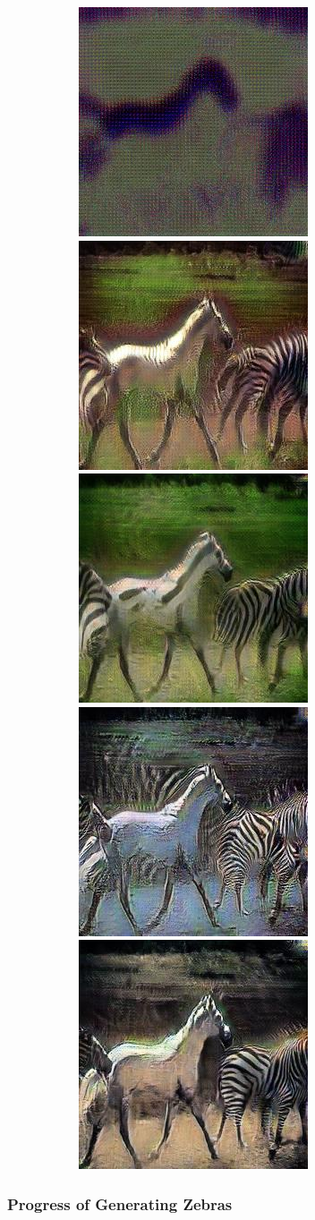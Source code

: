 \documentclass[12pt, fleqn, titlepage]{article}
\newcommand\skipper{1.4pt}
\newcommand\ripper{2.5pt}
\begin{document}
\begin{figure}[H]
\begin{subfigure}[b]{0.8\textwidth}
	\end{subfigure}
	\vskip\ripper
	\begin{subfigure}[b]{0.8\textwidth}
		\centering
		\includegraphics[width=0.15\linewidth]{imgs/horse2zebra_cycle/gaussnoise/progress/59_0_fake_b}
		\hskip\skipper
		\includegraphics[width=0.15\linewidth]{imgs/horse2zebra_cycle/gaussnoise/progress/59_20_fake_b}
		\hskip\skipper
		\includegraphics[width=0.15\linewidth]{imgs/horse2zebra_cycle/gaussnoise/progress/59_40_fake_b}
		\hskip\skipper
		\includegraphics[width=0.15\linewidth]{imgs/horse2zebra_cycle/gaussnoise/progress/59_60_fake_b}
		\hskip\skipper
		\includegraphics[width=0.15\linewidth]{imgs/horse2zebra_cycle/gaussnoise/progress/59_140_fake_b}
	\end{subfigure}
\end{figure}


\subsubsection{Progress of Generating Zebras}
\end{document}

